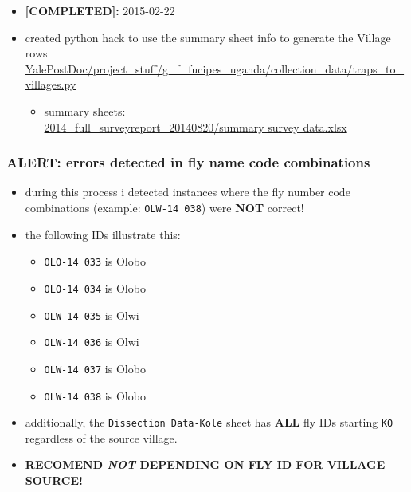 \documentclass[letterpaper]{scrartcl}
\begin{document}
\begin{itemize}
\item
  \textbf{{[}COMPLETED{]}:} 2015-02-22
\item
  created python hack to use the summary sheet info to generate the
  Village
  rows\\\href{/home/gus/Documents/YalePostDoc/project_stuff/g_f_fucipes_uganda/collection_data/traps_to_villages.py}{YalePostDoc/project\_stuff/g\_f\_fucipes\_uganda/collection\_data/traps\_to\_villages.py}

  \begin{itemize}
  \itemsep1pt\parskip0pt
  \item
    summary
    sheets:\\\href{file:///home/gus/Dropbox/uganda_data/2014_Collection_Sheets_Spring-Summer/2014_full_surveyreport_20140820/summary\%20survey\%20data.xlsx}{2014\_full\_surveyreport\_20140820/summary
    survey data.xlsx}
  \end{itemize}
\end{itemize}

\subsubsection{ALERT: errors detected in fly name code
combinations}\label{alert-errors-detected-in-fly-name-code-combinations}

\begin{itemize}
\item
  during this process i detected instances where the fly number code
  combinations (example: \texttt{OLW-14 038}) were \textbf{NOT} correct!
\item
  the following IDs illustrate this:

  \begin{itemize}
  \itemsep1pt\parskip0pt
  \item
    \texttt{OLO-14 033} is Olobo
  \item
    \texttt{OLO-14 034} is Olobo
  \item
    \texttt{OLW-14 035} is Olwi
  \item
    \texttt{OLW-14 036} is Olwi
  \item
    \texttt{OLW-14 037} is Olobo
  \item
    \texttt{OLW-14 038} is Olobo
  \end{itemize}
\item
  additionally, the \texttt{Dissection Data-Kole} sheet has \textbf{ALL}
  fly IDs starting \texttt{KO} regardless of the source village.
\item
  \textbf{RECOMEND \emph{NOT} DEPENDING ON FLY ID FOR VILLAGE SOURCE!}
\end{itemize}
\end{document}
